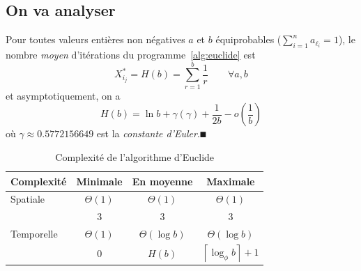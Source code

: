 \documentclass[a4paper,twoside,10pt,english,french]{article}   %
\renewcommand{\qed}{\hspace*{1em}\hfill\ensuremath{\QED}}  %
\theoremstyle{definition}
\theoremstyle{remark}
\theoremstyle{plain}
\begin{document}
\subsection{On va analyser}

Pour toutes valeurs entières non négatives $a$ et $b$ équiprobables ($\sum_{i=1}^n a_{\ell_i} = 1$), le nombre \emph{moyen} d'itérations du programme~\ref{alg:euclide} est
  \[ X_{i_j}^* = H(b) = \sum_{r=1}^b \frac{1}{r} \qquad \forall a, b  \]
et asymptotiquement, on a
  \[ H(b) = \ln b + \gamma (γ) + \frac{1}{2b} - o(\frac{1}{b}) \]
où $\gamma\approx0.5772156649$ est la \emph{constante d'Euler}.\qed

\begin{table}[htb]
  \caption{Complexité de l'algorithme d'Euclide}
  \centering
  \begin{tabular}{l|ccc}
    Complexité & Minimale         & En moyenne       & Maximale         \\
    \hline
    Spatiale   & $\Theta(1)$      & $\Theta(1)$      & $\Theta(1)$      \\
               & $3$              & $3$              & $3$              \\
    \hline
    Temporelle & $\Theta(1)$      & $\Theta(\log b)$ & $\Theta(\log b)$ \\
               & $0$              & $H(b)$           &
                             $\left\lceil \log_\phi b \right\rceil + 1$ \\
  \end{tabular}
\end{table}
\end{document}
